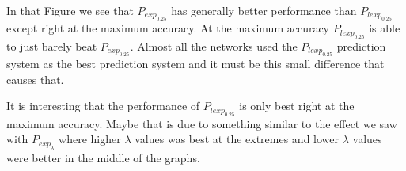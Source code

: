 \begin{description}
        In that Figure we see that $P_{exp_{0.25}}$ has generally better
        performance than $P_{lexp_{0.25}}$ except right at the maximum accuracy.
        At the maximum accuracy $P_{lexp_{0.25}}$ is able to just barely beat
        $P_{exp_{0.25}}$. Almost all the networks used the $P_{lexp_{0.25}}$
        prediction system as the best prediction system and it must be this
        small difference that causes that.

        It is interesting that the performance of $P_{lexp_{0.25}}$ is only best
        right at the maximum accuracy. Maybe that is due to something similar to
        the effect we saw with $P_{exp_{\lambda}}$ where higher $\lambda$ values
        was best at the extremes and lower $\lambda$ values were better in the
        middle of the graphs.

\end{description}
